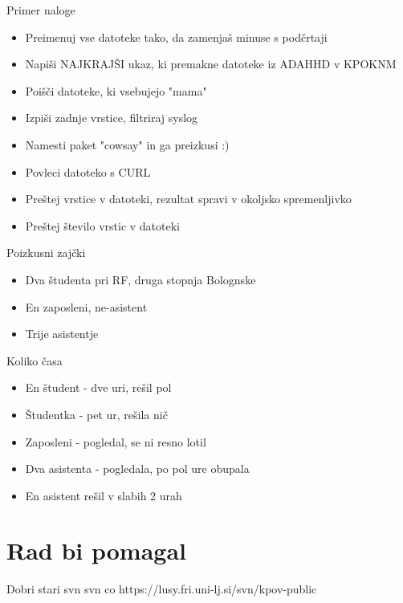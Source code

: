 \documentclass{beamer}
\begin{document}
\begin{frame}{Primer naloge}
  \begin{itemize}
    \item Preimenuj vse datoteke tako, da zamenjaš minuse s podčrtaji
    \item Napiši NAJKRAJŠI ukaz, ki premakne datoteke iz ADAHHD v KPOKNM
    \item Poišči datoteke, ki vsebujejo "mama"
    \item Izpiši zadnje vrstice, filtriraj syslog 
    \item Namesti paket "cowsay" in ga preizkusi :)
    \item Povleci datoteko s CURL
    \item Preštej vrstice v datoteki, rezultat spravi v okoljsko spremenljivko
    \item Preštej število vrstic v datoteki
  \end{itemize}
\end{frame}

\begin{frame}{Poizkusni zajčki}
  \begin{itemize}[<+->]
    \item Dva študenta pri RF, druga stopnja Bolognske
    \item En zaposleni, ne-asistent
    \item Trije asistentje
  \end{itemize}
\end{frame}

\begin{frame}{Koliko časa}
  \begin{itemize}
    \item En študent - dve uri, rešil pol
    \item Študentka - pet ur, rešila nič
    \item Zaposleni - pogledal, se ni resno lotil
    \item Dva asistenta - pogledala, po pol ure obupala
    \item En asistent rešil v slabih 2 urah
  \end{itemize}
\end{frame}

\section{Rad bi pomagal}

\begin{frame}{Dobri stari svn}
  svn co https://lusy.fri.uni-lj.si/svn/kpov-public
\end{frame}
\end{document}
